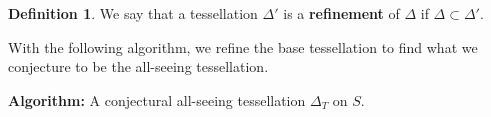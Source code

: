 \documentclass[12pt,reqno]{amsart}
\DeclareMathOperator{\Aut}{Aut}
\theoremstyle{definition}
\newtheorem{defn}{Definition}
\theoremstyle{remark}
\newcommand{\DD}{\Delta\kern -8.3pt {\diamond} \kern -4.5pt \cdot \:}
\begin{document}
\begin{defn} We say that a tessellation $\Delta'$ is a \textbf{refinement} of $\Delta$ if $\Delta \subset \Delta'$. \end{defn}

With the following algorithm, we refine the base tessellation to find what we conjecture to be the all-seeing tessellation. 

\vspace{+7pt}


\textbf{Algorithm:} A conjectural all-seeing tessellation $\Delta_T$ on $S$.


\end{document}
